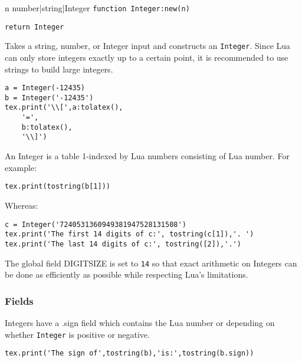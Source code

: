\documentclass{article}
\newcommand{\newcoderef}[3]{%
\begin{newcodehead}[sidebyside,segmentation hidden]{#3}%
    \texttt{#1}%
    \tcblower%
    \begin{flushright}%
    \texttt{#2}%
    \end{flushright}%
\end{newcodehead}%
}
\begin{document}
\newcoderef{function Integer:new(n)}{return Integer}{n number|string|Integer}

Takes a string, number, or {\ttfamily Integer} input and constructs an \texttt{Integer}. Since Lua can only store integers exactly up to a certain point, it is recommended to use strings to build large integers.

\begin{codebox}
    \begin{verbatim}
a = Integer(-12435)
b = Integer('-12435')
tex.print('\\[',a:tolatex(),
    '=',
    b:tolatex(),
    '\\]')
\end{verbatim}
\tcblower
{}
\end{codebox}
An {\ttfamily Integer} is a table 1-indexed by Lua numbers consisting of Lua number. For example:
\begin{codebox}
    \begin{verbatim}
tex.print(tostring(b[1]))
\end{verbatim}
\tcblower
{}
\end{codebox}
Whereas:
\begin{codebox}[]
    \begin{verbatim}
c = Integer('7240531360949381947528131508')
tex.print('The first 14 digits of c:', tostring(c[1]),'. ')
tex.print('The last 14 digits of c:', tostring([2]),'.')
\end{verbatim}
\tcblower
{}
\end{codebox}

The global field {\ttfamily DIGITSIZE} is set to \texttt{14} so that exact arithmetic on {\ttfamily Integer}s can be done as efficiently as possible while respecting Lua's limitations.

\subsubsection*{Fields}
{\ttfamily Integer}s have a {\ttfamily .sign} field which contains the Lua number {} or {} depending on whether \texttt{Integer} is positive or negative. 
\begin{codebox}[]
    \begin{verbatim}
tex.print('The sign of',tostring(b),'is:',tostring(b.sign))
\end{verbatim}
\tcblower
{}
\end{codebox}
\end{document}
